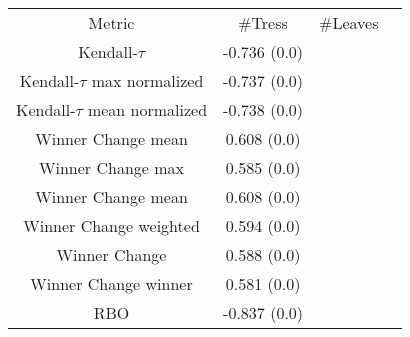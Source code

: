 \begin{tabular}{c|c|c|c} 
Metric & #Tress & #Leaves \\ 
Kendall-$\tau$ & -0.736 (0.0)   \\ 
Kendall-$\tau$ max normalized & -0.737 (0.0)  \\ 
Kendall-$\tau$ mean normalized & -0.738 (0.0)  \\ 
Winner Change mean& 0.608 (0.0) &  \\ 
Winner Change max & 0.585 (0.0) \\ 
Winner Change mean & 0.608 (0.0) &  \\ 
Winner Change weighted & 0.594 (0.0) \\ 
Winner Change & 0.588 (0.0) \\ 
Winner Change winner & 0.581 (0.0)  \\ 
RBO & -0.837 (0.0) \\ 
\end{tabular}